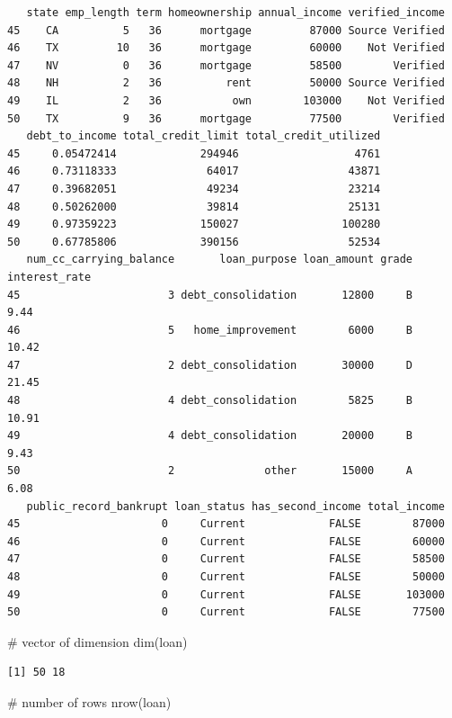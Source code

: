 \documentclass[
  letterpaper,
  DIV=11,
  numbers=noendperiod]{scrreprt}
\newenvironment{Shaded}{\begin{snugshade}}{\end{snugshade}}
\newcommand{\CommentTok}[1]{\textcolor[rgb]{0.37,0.37,0.37}{#1}}
\newcommand{\FunctionTok}[1]{\textcolor[rgb]{0.28,0.35,0.67}{#1}}
\newcommand{\NormalTok}[1]{\textcolor[rgb]{0.00,0.23,0.31}{#1}}
\begin{document}
\begin{tcolorbox}
\begin{verbatim}
   state emp_length term homeownership annual_income verified_income
45    CA          5   36      mortgage         87000 Source Verified
46    TX         10   36      mortgage         60000    Not Verified
47    NV          0   36      mortgage         58500        Verified
48    NH          2   36          rent         50000 Source Verified
49    IL          2   36           own        103000    Not Verified
50    TX          9   36      mortgage         77500        Verified
   debt_to_income total_credit_limit total_credit_utilized
45     0.05472414             294946                  4761
46     0.73118333              64017                 43871
47     0.39682051              49234                 23214
48     0.50262000              39814                 25131
49     0.97359223             150027                100280
50     0.67785806             390156                 52534
   num_cc_carrying_balance       loan_purpose loan_amount grade interest_rate
45                       3 debt_consolidation       12800     B          9.44
46                       5   home_improvement        6000     B         10.42
47                       2 debt_consolidation       30000     D         21.45
48                       4 debt_consolidation        5825     B         10.91
49                       4 debt_consolidation       20000     B          9.43
50                       2              other       15000     A          6.08
   public_record_bankrupt loan_status has_second_income total_income
45                      0     Current             FALSE        87000
46                      0     Current             FALSE        60000
47                      0     Current             FALSE        58500
48                      0     Current             FALSE        50000
49                      0     Current             FALSE       103000
50                      0     Current             FALSE        77500
\end{verbatim}

\begin{Shaded}
\begin{Highlighting}[]
\CommentTok{\# vector of dimension}
\FunctionTok{dim}\NormalTok{(loan)}
\end{Highlighting}
\end{Shaded}

\begin{verbatim}
[1] 50 18
\end{verbatim}

\begin{Shaded}
\begin{Highlighting}[]
\CommentTok{\# number of rows}
\FunctionTok{nrow}\NormalTok{(loan)}
\end{Highlighting}
\end{Shaded}


\end{tcolorbox}
\end{document}
